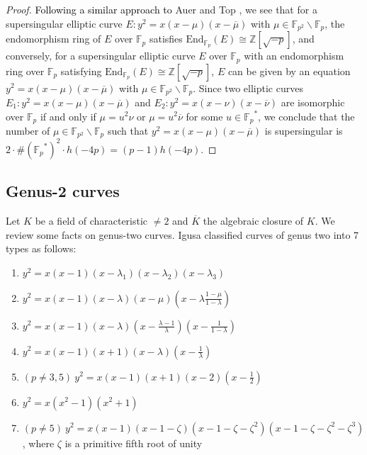 \documentclass[a4paper, 11pt]{article}
\theoremstyle{plain}
\newcommand{\?}{\textcolor{red}{??}}
\newcommand{\lm}{\lambda}
\newcommand{\fp}{\mathbb{F}_p}
\newcommand{\fpp}{\mathbb{F}_{p^2}}
\newcommand{\bZ}{\mathbb{Z}}
\begin{document}
\begin{proof}
    \textcolor{black}{Following a similar approach to} Auer and Top {\cite[Proposition 3.2.]{AT02}}, we see that for a supersingular elliptic curve $E:y^2=x(x-\mu)(x-\overline{\mu})$ with $\mu \in \fpp \smallsetminus \fp$, the endomorphism ring of $E$ over $\fp$ satisfies ${\text{End}}_{\fp} (E) \cong \bZ[\sqrt{-p}]$, and conversely, for a supersingular elliptic curve $E$ over $\fp$ with an endomorphism ring over $\fp$ satisfying ${\text{End}}_{\fp}(E) \cong \bZ[\sqrt{-p}]$, $E$ can be given by an equation $y^2=x(x-\mu)(x-\overline{\mu})$ with $\mu \in \fpp \smallsetminus \fp$. Since two elliptic curves $E_{1}:y^2=x(x-\mu)(x-\overline{\mu})$ and $E_{2}:y^2=x(x-\nu)(x-\overline{\nu})$ are isomorphic over $\fp$ if and only if $\mu = u^2\nu$ or $\mu=u^2\overline{\nu}$ for some $u \in {\fp}^{*}$, we conclude that
    the number of $\mu \in  \fpp \smallsetminus \fp$
such that $y^2=x(x-\mu)(x-\overline{\mu})$ is supersingular is
    $2 \cdot \# \left({\fp}^{*}\right)^2 \cdot h(-4p)=(p-1)h(-4p)$.
\end{proof}

\subsection{Genus-2 curves}\label{subsec:2.2}
Let $K$ be a field of characteristic $\ne 2$ and $\overline K$ the algebraic closure of $K$. We review some facts on genus-two curves. Igusa \cite{Igusa} classified curves of genus two into 7 types as follows: 
\begin{enumerate}
   \item[(0)]$y^2=x(x-1)(x-{\lm}_1)(x-{\lm}_2)(x-{\lm}_3)$
        \item [(1)]$y^2=x(x-1)(x-\lm)(x-\mu)\left(x-\lm\frac{1-\mu}{1-\lm} \right)$
        \item[(2)]$y^2=x(x-1)(x-\lm)\left(x-\frac{\lm-1}{\lm}\right) \left(x-\frac{1}{1-\lm}\right)$
        \item[(3)] $y^2=x(x-1)(x+1)(x-\lm)\left(x-\frac{1}{\lm}\right)$
        \item[(4)]$(p\neq 3,5) \ y^2=x(x-1)(x+1)(x-2)\left(x-\frac{1}{2}\right) $
        \item[(5)]$y^2=x(x^2-1)(x^2+1) $
        \item[(6)]$(p \neq 5) \ y^2=x(x-1)(x-1-\zeta)(x-1-\zeta-{\zeta}^2)(x-1-\zeta-{\zeta}^2-{\zeta}^3)$, where $\zeta$ is a primitive fifth root of unity
    \end{enumerate}
\end{document}
